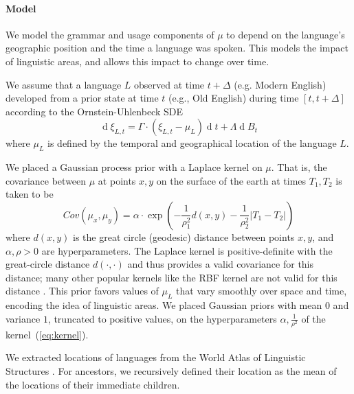 \documentclass[11pt,a4paper]{article}
\begin{document}
\paragraph{Model}
We model the grammar and usage components of $\mu$ to depend on the language's geographic position and the time a language was spoken.
This models the impact of linguistic areas, and allows this impact to change over time.

We assume that a language $L$ observed at time $t+\Delta$ (e.g. Modern English) developed from a prior state at time $t$ (e.g., Old English) during time $[t, t+\Delta]$ according to the Ornstein-Uhlenbeck SDE
\begin{equation}
    \operatorname{d}\xi_{L,t} = \Gamma \cdot (\xi_{L,t}-\mu_L) \operatorname{d}t + \Lambda \operatorname{d}B_t
\end{equation}
where $\mu_L$ is defined by the temporal and geographical location of the language $L$.


We placed a Gaussian process prior with a Laplace kernel on $\mu$.
That is, the covariance between $\mu$ at points $x, y$ on the surface of the earth at times $T_1, T_2$ is taken to be
\begin{equation}\label{eq:kernel}
    Cov(\mu_x, \mu_y) = \alpha \cdot \exp\left(-\frac{1}{\rho^2_1} d(x,y) - \frac{1}{\rho_2^2} |T_1-T_2|\right)
\end{equation}
where $d(x,y)$ is the great circle (geodesic) distance between points $x, y$, and $\alpha, \rho>0$ are hyperparameters.
The Laplace kernel is positive-definite with the great-circle distance $d(\cdot, \cdot)$ \citep{feragen2015geodesic} and thus provides a valid covariance for this distance; many other popular kernels like the RBF kernel are not valid for this distance \citep{feragen2015geodesic}.
This prior favors values of $\mu_L$ that vary smoothly over space and time, encoding the idea of linguistic areas.
We placed Gaussian priors with mean $0$ and variance $1$, truncated to positive values, on the hyperparameters $\alpha, \frac{1}{\rho^2}$ of the kernel~(\ref{eq:kernel}).


We extracted locations of languages from the World Atlas of Linguistic Structures \citep{haspelmath2005the}.
For ancestors, we recursively defined their location as the mean of the locations of their immediate children.


\end{document}

